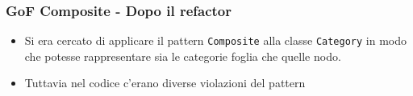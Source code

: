 \begin{frame}
    \frametitle{GoF Composite - Dopo il refactor}

    \begin{minipage}{.5\textwidth}
        \begin{figure}
            \centering
        \end{figure}
    \end{minipage}
    \begin{minipage}{.49\textwidth}
        \begin{itemize}
            \item<1-> Si era cercato di applicare il pattern \texttt{Composite} alla classe \texttt{Category} in modo che potesse rappresentare sia le categorie foglia che quelle nodo.
            \item<2-> Tuttavia nel codice c'erano diverse violazioni del pattern
        \end{itemize}
    \end{minipage}

\end{frame}